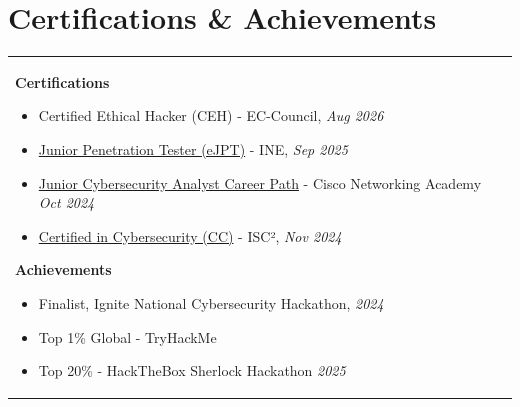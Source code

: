 \documentclass[a4paper,8pt]{article}
\begin{document}
\section{\textbf{Certifications \& Achievements}}
\begin{tabularx}{\linewidth}{ @{}l r@{} }
\begin{minipage}[t]{\linewidth}
\textbf{Certifications}
    \begin{itemize}[nosep,after=\strut, leftmargin=1em, itemsep=2pt]
        \item Certified Ethical Hacker (CEH) - EC-Council, \textit{Aug 2026}    
        \item \href{https://certs.ine.com/a94fd2a6-f00c-460d-ac60-462147fbde23}{Junior Penetration Tester (eJPT)} - INE, \textit{Sep 2025}
        \item \href{https://www.credly.com/badges/0286da72-eb8e-45db-bfad-28cd2af7c71a/public_url}{Junior Cybersecurity Analyst Career Path} - Cisco Networking Academy \textit{Oct 2024}
        \item \href{https://www.credly.com/badges/e31cce24-1238-4274-869e-a73954eae98c/public_url}{Certified in Cybersecurity (CC)} - ISC², \textit{Nov 2024}
    \end{itemize}
\vspace{2pt}
\textbf{Achievements}
    \begin{itemize}[nosep,after=\strut, leftmargin=1em, itemsep=2pt]
        \item Finalist, Ignite National Cybersecurity Hackathon, \textit{2024}
        \item Top 1\% Global - TryHackMe
        \item Top 20\% - HackTheBox Sherlock Hackathon \textit{2025}
    \end{itemize}
\end{minipage}
\end{tabularx}
\end{document}
